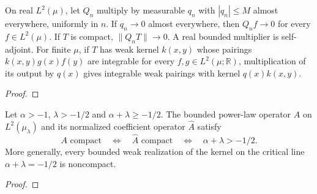 \begin{supporting}
\begin{theorem}
\label{thm:vanishing-l2-multipliers}
\leanok
On real $L^2(\mu)$, let $Q_n$ multiply by measurable $q_n$ with
$|q_n|\le M$ almost everywhere, uniformly in $n$. If $q_n\to0$ almost
everywhere, then $Q_nf\to0$ for every $f\in L^2(\mu)$.
If $T$ is compact, $\|Q_nT\|\to0$.
A real bounded multiplier is self-adjoint. For finite $\mu$, if $T$ has weak
kernel $k(x,y)$ whose pairings $k(x,y)g(x)f(y)$ are integrable for every $f,g\in L^2(\mu;\mathbb R)$, multiplication of its
output by $q(x)$ gives integrable weak pairings with kernel $q(x)k(x,y)$.
\end{theorem}
\begin{proof}
\leanok
\end{proof}
\end{supporting}


\begin{theorem}
\label{thm:power-law-compactness-classification}
\leanok
Let $\alpha>-1$, $\lambda>-1/2$ and $\alpha+\lambda\ge-1/2$.
The bounded power-law operator $A$ on $L^2(\mu_\lambda)$ and its normalized
coefficient operator $\widehat A$ satisfy
\[
 A\text{ compact}\quad\Longleftrightarrow\quad
 \widehat A\text{ compact}\quad\Longleftrightarrow\quad
 \alpha+\lambda>-1/2.
\]
More generally, every bounded weak realization of the kernel on the critical
line $\alpha+\lambda=-1/2$ is noncompact.
\end{theorem}
\begin{proof}
\leanok
\end{proof}

